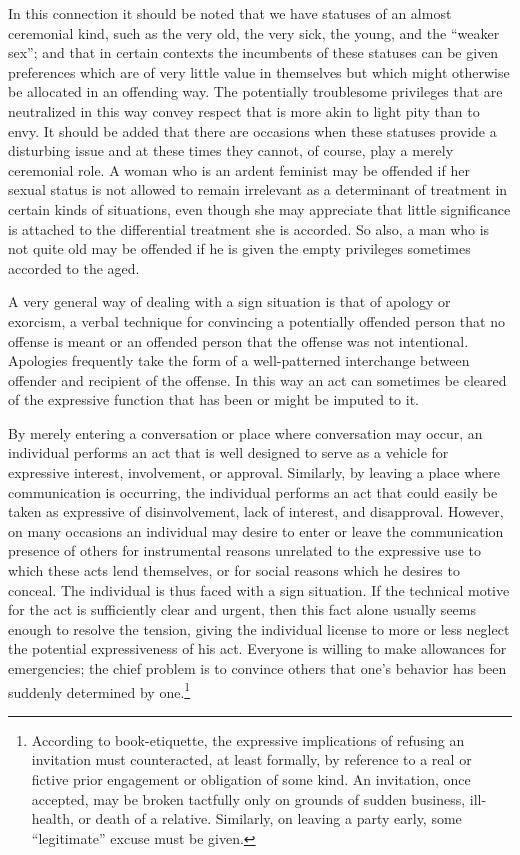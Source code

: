 \documentclass[twoside,symmetric,nobib,justified]{tufte-book}
\begin{document}
In this connection it should be noted that we have statuses of an almost
ceremonial kind, such as the very old, the very sick, the young, and the
``weaker sex''; and that in certain contexts the incumbents of these
statuses can be given preferences which are of very little value in
themselves but which might otherwise be allocated in an offending way.
The potentially troublesome privileges that are neutralized in this way
convey respect that is more akin to light pity than to envy. It should
be added that there are occasions when these statuses provide a
disturbing issue and at these times they cannot, of course, play a
merely ceremonial role. A woman who is an ardent feminist may be
offended if her sexual status is not allowed to remain irrelevant as a
determinant of treatment in certain kinds of situations, even though she
may appreciate that little significance is attached to the differential
treatment she is accorded. So also, a man who is not quite old may be
offended if he is given the empty privileges sometimes accorded to the
aged.

A very general way of dealing with a sign situation is that of apology
or exorcism, a verbal technique for convincing a potentially offended
person that no offense is meant or an offended person that the offense
was not intentional. Apologies frequently take the form of a
well-patterned interchange between offender and recipient of the
offense. In this way an act can sometimes be cleared of the expressive
function that has been or might be imputed to it.

By merely entering a conversation or place where conversation may occur,
an individual performs an act that is well designed to serve as a
vehicle for expressive interest, involvement, or approval. Similarly, by
leaving a place where communication is occurring, the individual
performs an act that could easily be taken as expressive of
disinvolvement, lack of interest, and disapproval. However, on many
occasions an individual may desire to enter or leave the communication
presence of others for instrumental reasons unrelated to the expressive
use to which these acts lend themselves, or for social reasons which he
desires to conceal. The individual is thus faced with a sign situation.
If the technical motive for the act is sufficiently clear and urgent,
then this fact alone usually seems enough to resolve the tension, giving
the individual license to more or less neglect the potential
expressiveness of his act. Everyone is willing to make allowances for
emergencies; the chief problem is to convince others that one's behavior
has been suddenly determined by one.\footnote{According to
  book-etiquette, the expressive implications of refusing an invitation
  must counteracted, at least formally, by reference to a real or
  fictive prior engagement or obligation of some kind. An invitation,
  once accepted, may be broken tactfully only on grounds of sudden
  business, ill-health, or death of a relative. Similarly, on leaving a
  party early, some ``legitimate'' excuse must be given.}
\end{document}
